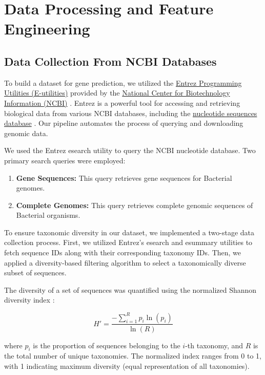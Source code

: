 \documentclass[
	a4paper, %
	10pt, %
	unnumberedsections, %
	twoside, %
]{LTJournalArticle}
\begin{document}

\section{Data Processing and Feature Engineering}

\subsection{Data Collection From NCBI Databases}

To build a dataset for gene prediction, we utilized the \href{https://www.ncbi.nlm.nih.gov/books/NBK25501/}{Entrez Programming Utilities (E-utilities)} provided by the \href{https://www.ncbi.nlm.nih.gov/}{National Center for Biotechnology Information (NCBI)} \cite{Sayers:2022, EntrezProgramming}. Entrez is a powerful tool for accessing and retrieving biological data from various NCBI databases, including the \href{https://www.ncbi.nlm.nih.gov/nucleotide/}{nucleotide sequences database} \cite{Leinonen:2011}. Our pipeline automates the process of querying and downloading genomic data.

We used the Entrez esearch utility to query the NCBI nucleotide database. Two primary search queries were employed:

\begin{enumerate}
	\item \textbf{Gene Sequences:} This query retrieves gene sequences for Bacterial genomes.
	\item \textbf{Complete Genomes:} This query retrieves complete genomic sequences of Bacterial organisms.
\end{enumerate}

To ensure taxonomic diversity in our dataset, we implemented a two-stage data collection process. First, we utilized Entrez's esearch and esummary utilities to fetch sequence IDs along with their corresponding taxonomy IDs. Then, we applied a diversity-based filtering algorithm to select a taxonomically diverse subset of sequences.

The diversity of a set of sequences was quantified using the normalized Shannon diversity index \cite{Shannon:1948, Morris:2014}:

\begin{equation}
H' = \frac{-\sum_{i=1}^{R} p_i \ln(p_i)}{\ln(R)}
\end{equation}

where $p_i$ is the proportion of sequences belonging to the $i$-th taxonomy, and $R$ is the total number of unique taxonomies. The normalized index ranges from 0 to 1, with 1 indicating maximum diversity (equal representation of all taxonomies).
\end{document}
